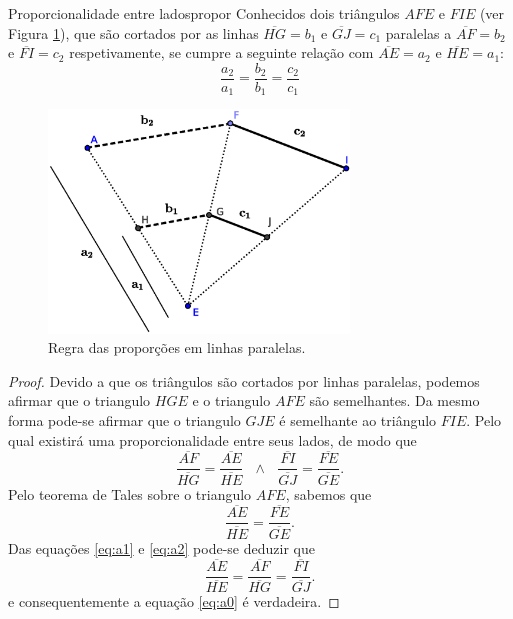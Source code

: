 \documentclass[a4paper,10pt]{article}
\begin{document}
\begin{theoremtcolorbox}{Proporcionalidade entre lados}{propor}
Conhecidos dois triângulos $AFE$ e $FIE$ (ver Figura \ref{fig:model}), que são cortados
por as linhas $\overline{HG}=b_1$ e $\overline{GJ}=c_1$ paralelas a $\overline{AF}=b_2$ 
e $\overline{FI}=c_2$ respetivamente, se cumpre a seguinte relação com $\overline{AE}=a_2$ 
e $\overline{HE}=a_1$:
\begin{equation}\label{eq:a0}
 \frac{a_2}{a_1}=\frac{b_2}{b_1}=\frac{c_2}{c_1}
\end{equation}
\end{theoremtcolorbox}
\begin{figure}[!t]
\center
 \includegraphics[width=8.0cm]{./images/paralelas.eps}
\caption{Regra das proporções em linhas paralelas.}
\label{fig:model}
\end{figure} 
\begin{proof}
Devido a que os triângulos são cortados por linhas paralelas, podemos afirmar que
o triangulo $HGE$ e o triangulo $AFE$ são semelhantes. Da mesmo forma pode-se afirmar 
que o triangulo $GJE$ é semelhante ao triângulo $FIE$. Pelo qual 
existirá uma proporcionalidade entre seus lados, de modo que
\begin{equation}\label{eq:a1}
 \frac{\overline{AF}}{\overline{HG}}=\frac{\overline{AE}}{\overline{HE}}~~~\wedge~~~ \frac{\overline{FI}}{\overline{GJ}}=\frac{\overline{FE}}{\overline{GE}}.
\end{equation}
Pelo teorema de Tales sobre o triangulo $AFE$, sabemos que
\begin{equation}\label{eq:a2}
 \frac{\overline{AE}}{\overline{HE}}=\frac{\overline{FE}}{\overline{GE}}.
\end{equation}
Das equações \eqref{eq:a1} e \eqref{eq:a2} pode-se deduzir que
\begin{equation}\label{eq:a3}
 \frac{\overline{AE}}{\overline{HE}}=\frac{\overline{AF}}{\overline{HG}}=\frac{\overline{FI}}{\overline{GJ}}.
\end{equation}
e consequentemente a equação \eqref{eq:a0} é verdadeira.
\end{proof}
\end{document}

